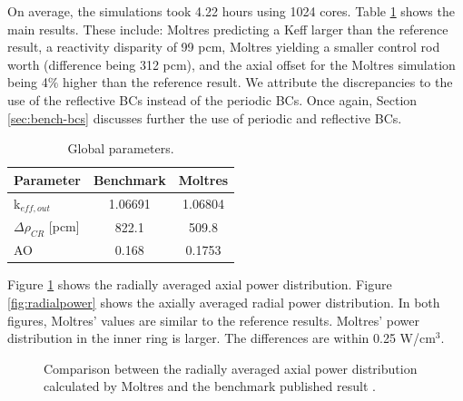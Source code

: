 On average, the simulations took 4.22 hours using 1024 cores.
Table \ref{tab:globalparam} shows the main results.
These include: Moltres predicting a \gls{Keff} larger than the reference result, a reactivity disparity of 99 pcm, Moltres yielding a smaller control rod worth (difference being 312 pcm), and the axial offset for the Moltres simulation being 4$\%$ higher than the reference result.
We attribute the discrepancies to the use of the reflective BCs instead of the periodic BCs.
Once again, Section \ref{sec:bench-bcs} discusses further the use of periodic and reflective BCs.

\begin{table}[htbp!]
  \centering
  \caption{Global parameters.}
  \begin{tabular}{lcc}
  \toprule
  Parameter 	&  Benchmark  &  Moltres    \\
  \midrule
  k$_{eff, out}$ 	&  1.06691    &  1.06804    \\
  $\Delta \rho_{CR}$ [pcm]  & 822.1 	& 509.8 \\
  AO        	&  0.168      &  0.1753     \\
  \bottomrule
  \end{tabular}
  \label{tab:globalparam}
\end{table}

Figure \ref{fig:axialpower} shows the radially averaged axial power distribution.
Figure \ref{fig:radialpower} shows the axially averaged radial power distribution.
In both figures, Moltres' values are similar to the reference results.
Moltres' power distribution in the inner ring is larger.
The differences are within 0.25 W/cm$^3$.

\begin{figure}[htbp!]
	\centering
	\hfill
	\caption{Comparison between the radially averaged axial power distribution calculated by Moltres and the benchmark published result \cite{oecd_nea_coupled_2020}.}
	\label{fig:axialpower}
\end{figure}

